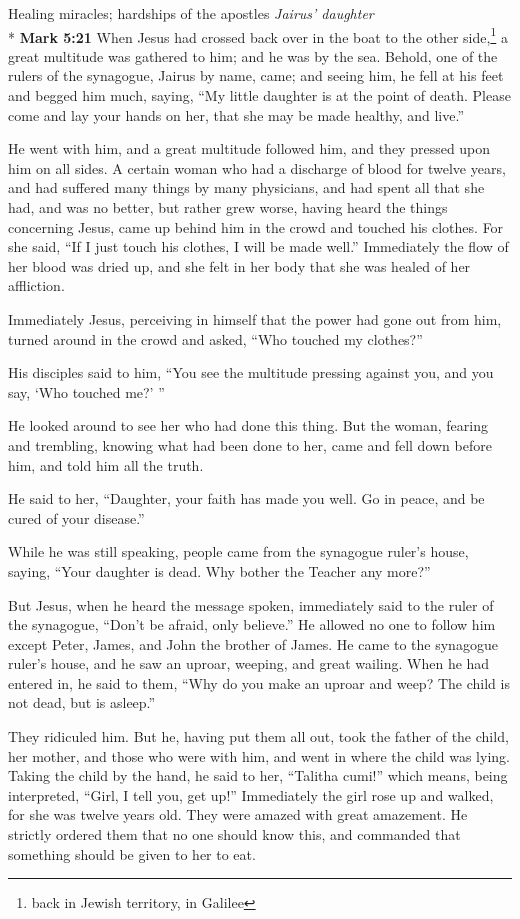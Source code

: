 \documentclass[10pt,twoside]{article} %
\newcommand{\quotesize}{\normalsize{}}
\newenvironment{quotetext}{\begingroup\quotesize}{\endgroup}
\newcommand{\intex}[1]{\index[texts]{#1}}
\newcommand{\bible}[2]{\begin{quotetext}\textbf{#1}\intex{#1} #2\end{quotetext}}
\newcommand{\gospelmark}[2]{\bible{Mark #1}{#2}}
\newcommand{\subhead}[1]{\emph{#1}\\*}
\begin{document}
\begin{section}{Healing miracles; hardships of the apostles}
\subhead{Jairus' daughter}
\gospelmark{5:21}{
  When Jesus had crossed back over in the boat to the other side,\footnote{back in Jewish territory, in Galilee} a great multitude was gathered to him; and he was by the sea.   Behold, one of the rulers of the synagogue, Jairus by name, came; and seeing him, he fell at his feet   and begged him much, saying, ``My little daughter is at the point of death. Please come and lay your hands on her, that she may be made healthy, and live.''

  He went with him, and a great multitude followed him, and they pressed upon him on all sides.   A certain woman who had a discharge of blood for twelve years,   and had suffered many things by many physicians, and had spent all that she had, and was no better, but rather grew worse,   having heard the things concerning Jesus, came up behind him in the crowd and touched his clothes.   For she said, ``If I just touch his clothes, I will be made well.''   Immediately the flow of her blood was dried up, and she felt in her body that she was healed of her affliction.

  Immediately Jesus, perceiving in himself that the power had gone out from him, turned around in the crowd and asked, ``Who touched my clothes?''

  His disciples said to him, ``You see the multitude pressing against you, and you say, `Who touched me?' ''

  He looked around to see her who had done this thing.   But the woman, fearing and trembling, knowing what had been done to her, came and fell down before him, and told him all the truth.

  He said to her, ``Daughter, your faith has made you well. Go in peace, and be cured of your disease.''

  While he was still speaking, people came from the synagogue ruler's house, saying, ``Your daughter is dead. Why bother the Teacher any more?''

  But Jesus, when he heard the message spoken, immediately said to the ruler of the synagogue, ``Don't be afraid, only believe.''   He allowed no one to follow him except Peter, James, and John the brother of James.   He came to the synagogue ruler's house, and he saw an uproar, weeping, and great wailing.   When he had entered in, he said to them, ``Why do you make an uproar and weep? The child is not dead, but is asleep.''

  They ridiculed him. But he, having put them all out, took the father of the child, her mother, and those who were with him, and went in where the child was lying.   Taking the child by the hand, he said to her, ``Talitha cumi!'' which means, being interpreted, ``Girl, I tell you, get up!''   Immediately the girl rose up and walked, for she was twelve years old. They were amazed with great amazement.   He strictly ordered them that no one should know this, and commanded that something should be given to her to eat.}


\end{section}
\end{document}
